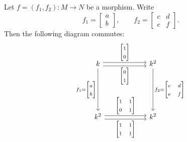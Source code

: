 \documentclass[11pt, a4paper]{report}
\begin{document}
\begin{example}
Let $f=(f_1,f_2):M \to N$ be a morphism. Write
\[
f_1=\begin{bmatrix}a\\b\end{bmatrix},
\qquad
f_2=\begin{bmatrix}c&d\\e&f\end{bmatrix}.
\]
Then the following diagram commutes:
\[
    \begin{tikzcd}[ampersand replacement=\&, column sep=6em, row sep=6em]
        k \arrow[r, "{\begin{bmatrix}1\\0\end{bmatrix}}", shift left] \arrow[d, "f_1={\begin{bmatrix}a\\b\end{bmatrix}}"'] \arrow[r, "{\begin{bmatrix}0\\1\end{bmatrix}}"', shift right] \& k^2 \arrow[d, "f_2={\begin{bmatrix}c&d\\e&f\end{bmatrix}    }"] \\
        k^2 \arrow[r, "{\begin{bmatrix}1 & 1\\0 & 1\end{bmatrix}}", shift left] \arrow[r, "{\begin{bmatrix}1 & 1\\1 & 1\end{bmatrix}}"', shift right]                                  \& k^2                                                      
        \end{tikzcd}
\]



\end{example}
\end{document}
